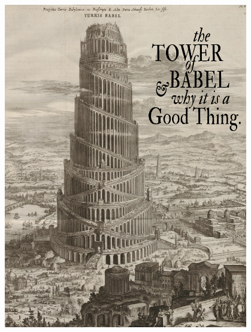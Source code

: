 \documentclass[final]{beamer}
\newlength{\sepwid}
\newlength{\onecolwid}
\begin{document}
\begin{frame}[t] %

\begin{columns}[t] %

\begin{column}{\sepwid}\end{column} %

\begin{column}{\onecolwid} %


\begin{figure}
\includegraphics[width=\linewidth]{img/babellong.png}


\end{figure}
\end{column}
\end{columns}
\end{frame}
\end{document}
